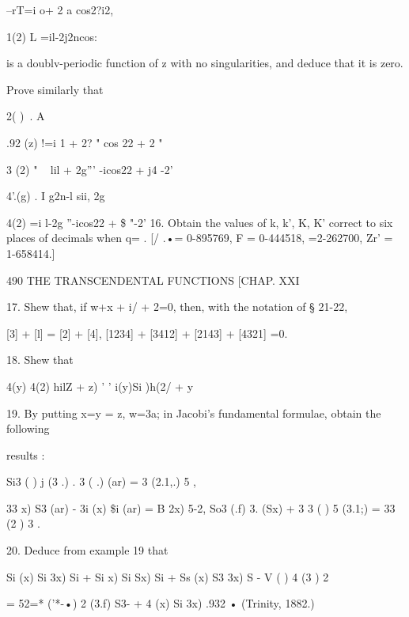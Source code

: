  --rT=i o+ 2 a cos2?i2,

 1(2) L =il-2j2ncos:

is a doublv-periodic function of z with no singularities, and deduce
that it is zero.

Prove similarly that

 2( )\ . A%

.92 (z) !=i 1 + 2? " cos 22 + 2 "

 3 (2) " ~ lil + 2g''' -icos22 + j4 -2'

 4'.(g) . I g2n-l sii, 2g

  4(2) =i l-2g ''-icos22 + \$ "-2' 16. Obtain the values of k, k', K,
K' correct to six places of decimals when q= . [/ .•= 0-895769, F =
0-444518, =2-262700, Zr' = 1-658414.]

490 THE TRANSCENDENTAL FUNCTIONS [CHAP. XXI

17. Shew that, if w+x + i/ + 2=0, then, with the notation of § 21-22,

[3] + [l] = [2] + [4], [1234] + [3412] + [2143] + [4321] =0.

18. Shew that

 4(y) 4(2) hilZ + z) ' ' i(y)Si )h(2/ + y

19. By putting x=y = z, w=3a; in Jacobi's fundamental formulae, obtain
the following

results :

Si3 ( ) j (3 .) . 3 ( .) (ar) = 3 (2.1,.) 5 ,

 33 x) S3 (ar) - 3i (x) \$i (ar) = B 2x) 5-2, So3 (.f) 3. (Sx) + 3 3 (
) 5 (3.1;) = 33 (2 ) 3 .

20. Deduce from example 19 that

 Si (x) Si 3x) Si + Si x) Si Sx) Si + Ss (x) S3 3x) S - V ( ) 4 (3 ) 2

= 52=* ('*-•) 2 (3.f) S3- + 4 (x) Si 3x) .932 • (Trinity, 1882.)


